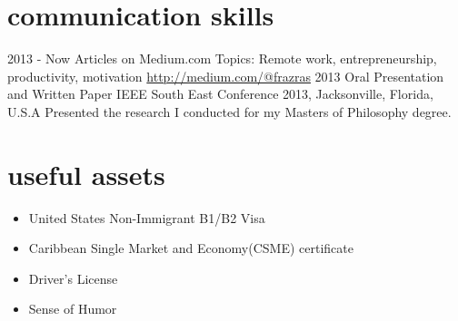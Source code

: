 \documentclass[]{friggeri-cv} %
\begin{document}



\newpage
\section{communication skills}

\begin{entrylist}

\entry
{2013 - Now}
{Articles on Medium.com}
{Topics: Remote work, entrepreneurship, productivity, motivation}
{\href{http://medium.com/@frazras}{http://medium.com/@frazras}}
\entry
{2013}
{Oral Presentation and Written Paper}
{IEEE South East Conference 2013, Jacksonville, Florida, U.S.A}
{Presented the research I conducted for my Masters of Philosophy degree.}
\end{entrylist}


\section{useful assets}
\begin{itemize}
	\item United States Non-Immigrant B1/B2 Visa
    \item Caribbean Single Market and Economy(CSME) certificate
    \item Driver's License
    \item Sense of Humor
\end{itemize}
\end{document}
